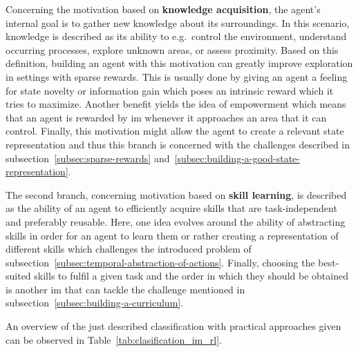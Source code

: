 \documentclass[draft,final]{vutinfth} %
\begin{document}
    Concerning the motivation based on \textbf{knowledge acquisition}, the agent's internal goal is to gather new knowledge about its surroundings.
    In this scenario, knowledge is described as its ability to e.g.\ control the environment, understand occurring processes, explore unknown areas, or assess proximity.
    Based on this definition, building an agent with this motivation can greatly improve exploration in settings with sparse rewards.
    This is usually done by giving an agent a feeling for state novelty or information gain which poses an intrinsic reward which it tries to maximize.
    Another benefit yields the idea of empowerment which means that an agent is rewarded by \gls{im} whenever it approaches an area that it can control.
    Finally, this motivation might allow the agent to create a relevant state representation and thus this branch is concerned with the challenges described in subsection~\ref{subsec:sparse-rewards} and~\ref{subsec:building-a-good-state-representation}.

    The second branch, concerning motivation based on \textbf{skill learning}, is described as the ability of an agent to efficiently acquire skills that are task-independent and preferably reusable.
    Here, one idea evolves around the ability of abstracting skills in order for an agent to learn them or rather creating a representation of different skills which challenges the introduced problem of subsection~\ref{subsec:temporal-abstraction-of-actions}.
    Finally, choosing the best-suited skills to fulfil a given task and the order in which they should be obtained is another \gls{im} that can tackle the challenge mentioned in subsection~\ref{subsec:building-a-curriculum}.

    An overview of the just described classification with practical approaches given can be observed in Table~\ref{tab:clasification_im_rl}.
\end{document}
